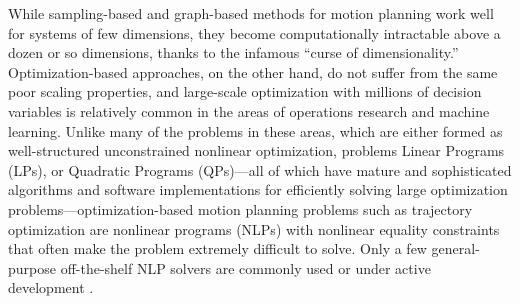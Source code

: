 \documentclass[conference]{IEEEtran}
\begin{document}
While sampling-based and graph-based methods for motion planning work well for systems of 
few dimensions, they become computationally intractable above a dozen or so dimensions,
thanks to the infamous ``curse of dimensionality.'' Optimization-based 
approaches, on the other hand, do not suffer from the same poor scaling properties, and
large-scale optimization with millions of decision variables is relatively common in the 
areas of operations research and machine learning. Unlike many of the problems in these 
areas, which are either formed as well-structured unconstrained nonlinear optimization, 
problems Linear Programs (LPs), or Quadratic Programs (QPs)---all of which have mature and 
sophisticated algorithms and software implementations for efficiently solving large 
optimization problems---optimization-based motion planning problems such as trajectory 
optimization are nonlinear programs (NLPs) with nonlinear equality constraints that often 
make the problem extremely difficult to solve. Only a few general-purpose off-the-shelf 
NLP solvers are commonly used or under active development 
\cite{wachter_implementation_2006,gill_SNOPT_2005}.
\end{document}

